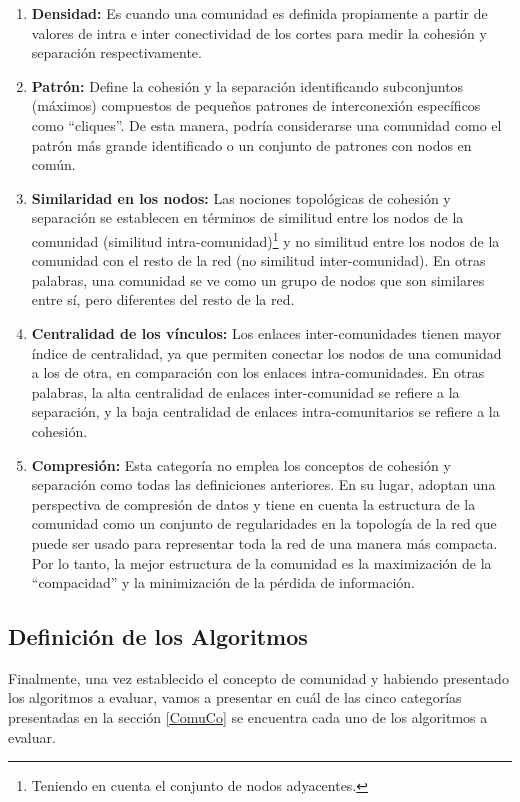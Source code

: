\documentclass[12pt,letter]{article}
\begin{document}
\begin{enumerate}
\item \textbf{Densidad:} Es cuando una comunidad es definida propiamente a partir de valores de intra e inter conectividad de los cortes para medir la cohesión y separación respectivamente.
\item \textbf{Patrón:} Define la cohesión y la separación identificando subconjuntos (máximos) compuestos de pequeños patrones de interconexión específicos como ``cliques''. De esta manera, podría considerarse una comunidad como el patrón más grande identificado o un conjunto de patrones con nodos en común.
\item \textbf{Similaridad en los nodos:} Las nociones topológicas de cohesión y separación se establecen en términos de similitud entre los nodos de la comunidad (similitud intra-comunidad)\footnote{Teniendo en cuenta el conjunto de nodos adyacentes.} y no similitud entre los nodos de la comunidad con el resto de la red (no similitud inter-comunidad). En otras palabras, una comunidad se ve como un grupo de nodos que son similares entre sí, pero diferentes del resto de la red.
\item \textbf{Centralidad de los vínculos:} Los enlaces inter-comunidades tienen mayor índice de centralidad, ya que permiten conectar los nodos de una comunidad a los de otra, en comparación con los enlaces intra-comunidades. En otras palabras, la alta centralidad de enlaces inter-comunidad se refiere a la separación, y la baja centralidad de enlaces intra-comunitarios se refiere a la cohesión.
\item \textbf{Compresión:} Esta categoría no emplea los conceptos de cohesión y separación como todas las definiciones anteriores. En su lugar, adoptan una perspectiva de compresión de datos y tiene en cuenta la estructura de la comunidad como un conjunto de regularidades en la topología de la red que puede ser usado para representar toda la red de una manera más compacta. Por lo tanto, la mejor estructura de la comunidad es la maximización de la ``compacidad'' y la minimización de la pérdida de información.
\end{enumerate}


\subsection{Definición de los Algoritmos} \label{DefAlg}
Finalmente, una vez establecido el concepto de comunidad y habiendo presentado los algoritmos a evaluar, vamos a presentar en cuál de las cinco categorías presentadas en la sección \ref{ComuCo} se encuentra cada uno de los algoritmos a evaluar.
\end{document}
